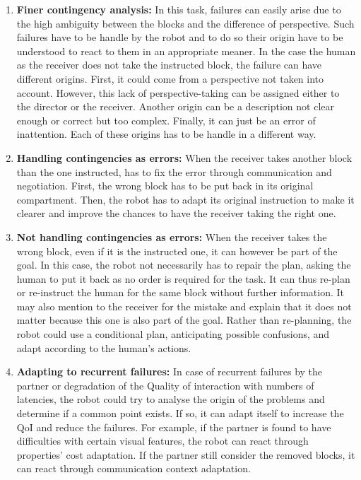 \begin{enumerate}

\item \textbf{Finer contingency analysis:} In this task, failures can easily arise due to the high ambiguity between the blocks and the difference of perspective. Such failures have to be handle by the robot and to do so their origin have to be understood to react to them in an appropriate meaner. In the case the human as the receiver does not take the instructed block, the failure can have different origins. First, it could come from a perspective not taken into account. However, this lack of perspective-taking can be assigned either to the director or the receiver. Another origin can be a description not clear enough or correct but too complex. Finally, it can just be an error of inattention. Each of these origins has to be handle in a different way. \label{chal:cont_analysis}

\item \textbf{Handling contingencies as errors:} When the receiver takes another block than the one instructed, has to fix the error through communication and negotiation. First, the wrong block has to be put back in its original compartment. Then, the robot has to adapt its original instruction to make it clearer and improve the chances to have the receiver taking the right one.\label{chal:cont_errors}

\item \textbf{Not handling contingencies as errors:} When the receiver takes the wrong block, even if it is the instructed one, it can however be part of the goal. In this case, the robot not necessarily has to repair the plan, asking the human to put it back as no order is required for the task. It can thus re-plan or re-instruct the human for the same block without further information. It may also mention to the receiver for the mistake and explain that it does not matter because this one is also part of the goal. Rather than re-planning, the robot could use a conditional plan, anticipating possible confusions, and adapt according to the human's actions.\label{chal:cont_not_errors}

\item \textbf{Adapting to recurrent failures:} In case of recurrent failures by the partner or degradation of the Quality of interaction with numbers of latencies, the robot could try to analyse the origin of the problems and determine if a common point exists. If so, it can adapt itself to increase the QoI and reduce the failures. For example, if the partner is found to have difficulties with certain visual features, the robot can react through properties' cost adaptation. If the partner still consider the removed blocks, it can react through communication context adaptation.\label{chal:change}


\end{enumerate}
